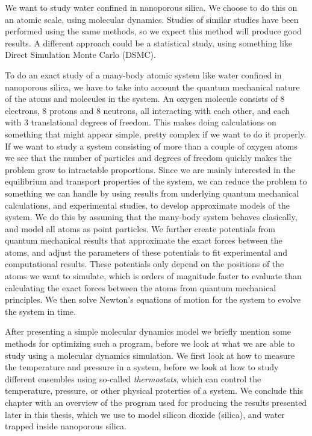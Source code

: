 We want to study water confined in nanoporous silica. We choose to do this on an atomic scale, using molecular dynamics. Studies of similar studies have been performed using the same methods, so we expect this method will produce good results. A different approach could be a statistical study, using something like Direct Simulation Monte Carlo (DSMC).

To do an exact study of a many-body atomic system like water confined in nanoporous silica, we have to take into account the quantum mechanical nature of the atoms and molecules in the system. An oxygen molecule consists of 8 electrons, 8 protons and 8 neutrons, all interacting with each other, and each with 3 translational degrees of freedom. This makes doing calculations on something that might appear simple, pretty complex if we want to do it properly. If we want to study a system consisting of more than a couple of oxygen atoms we see that the number of particles and degrees of freedom quickly makes the problem grow to intractable proportions. Since we are mainly interested in the equilibrium and transport properties of the system, we can reduce the problem to something we can handle by using results from underlying quantum mechanical calculations, and experimental studies, to develop approximate models of the system. We do this by assuming that the many-body system behaves clasically, and model all atoms as point particles. We further create potentials from quantum mechanical results that approximate the exact forces between the atoms, and adjust the parameters of these potentials to fit experimental and computational results. These potentials only depend on the positions of the atoms we want to simulate, which is orders of magnitude faster to evaluate than calculating the exact forces between the atoms from quantum mechanical principles. We then solve Newton's equations of motion for the system to evolve the system in time.


After presenting a simple molecular dynamics model we briefly mention some methods for optimizing such a program, before we look at what we are able to study using a molecular dynamics simulation. We first look at how to measure the temperature and pressure in a system, before we look at how to study different ensembles using so-called \emph{thermostats}, which can control the temperature, pressure, or other physical proterties of a system. We conclude this chapter with an overview of the program used for producing the results presented later in this thesis, which we use to model silicon dioxide (silica), and water trapped inside nanoporous silica.